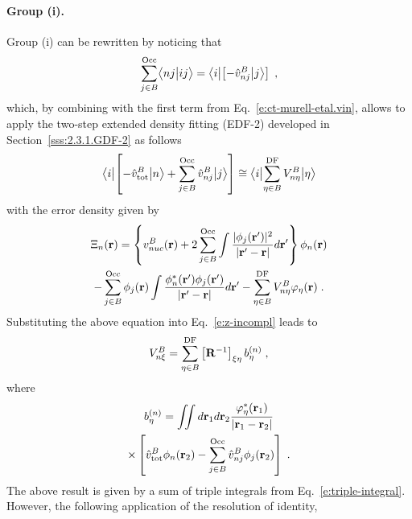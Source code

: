 \documentclass[aip,jcp,amsmath,amssymb,reprint,floatfix]{revtex4-1}
\begin{document}
\paragraph{Group (i).}
Group (i) can be rewritten by noticing that
%
\begin{equation} \label{e:ct-murell-etal.group-i.notice}
 \sum_{j\in B}^{\rm Occ} 
 \BraKet{nj}{ij} =
 \Bra{i} \left[ -\hat{v}^B_{nj} \Ket{j} \right]  \;,
\end{equation}
%
which, by combining with the first term from Eq.~\eqref{e:ct-murell-etal.vin}, 
allows to apply the two\hyp{}step extended density fitting (EDF-2) 
developed in Section~\ref{sss:2.3.1.GDF-2} as follows
%
\begin{equation} \label{e:v-oep.ct}
\Bra{i} \left[ -\hat{v}^B_{\rm tot} \Ket{n} + \sum_{j\in B}^{\rm Occ} \hat{v}^B_{nj} \Ket{j} \right]
\cong \Bra{i} \sum_{\eta\in B}^{\rm DF} V^B_{n\eta} \Ket{\eta}
\end{equation}
%
with the error density given by
%
\begin{multline}
 \Xi_n({\bf r}) = 
  \left\{
      v_{nuc}^B({\bf r}) + 2 \sum_{j\in B}^{\rm Occ}
   \int \frac{ \vert \phi_j({\bf r}') \vert^2 }{\vert {\bf r}' - {\bf r} \vert} d{\bf r}'
  \right\}
  \phi_n({{\bf r}})  \\
 - \sum_{j\in B}^{\rm Occ} \phi_j({{\bf r}})
   \int \frac{ \phi^*_n({\bf r}') \phi_j({{\bf r}'}) }{\vert {\bf r}' - {\bf r} \vert} d{\bf r}'
 - \sum_{\eta\in B}^{\rm DF} V^B_{n\eta} \varphi_\eta({\bf r}) \;.
\end{multline}
%
Substituting the above equation into Eq.~\eqref{e:z-incompl}
leads to
%
\begin{equation} \label{e:v-oep-group-1-prefinal}
 V^B_{n\xi} = \sum_{\eta\in B}^{\rm DF} \left[ {\bf R}^{-1} \right]_{\xi\eta} b_\eta^{(n)} \;,
\end{equation}
%
where
%
\begin{multline}
 b^{(n)}_\eta = \iint 
           d{\bf r}_1 d{\bf r}_2  
           \frac{ \varphi^*_\eta({\bf r}_1) }
            {\vert {\bf r}_1 - {\bf r}_2 \vert } \\ \times
          \left[ 
           \hat{v}^B_{\rm tot}  \phi_n({\bf r}_2) 
         - \sum_{j\in B}^{\rm Occ} \hat{v}^B_{nj} \phi_j({{\bf r}_2})
           \right]  \;.
\end{multline}
%
The above result is given by a sum of triple integrals from Eq.~\eqref{e:triple-integral}.
However, the following application of the resolution of identity,
\end{document}
